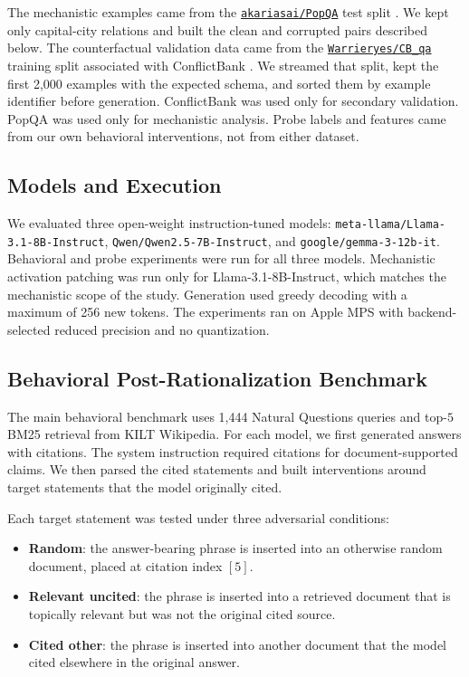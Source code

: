 \documentclass[11pt]{article}
\begin{document}
The mechanistic examples came from the \href{https://huggingface.co/datasets/akariasai/PopQA}{\texttt{akariasai/PopQA}} test split \cite{mallen2023popqa}. We kept only capital-city relations and built the clean and corrupted pairs described below. The counterfactual validation data came from the \href{https://huggingface.co/datasets/Warrieryes/CB_qa}{\texttt{Warrieryes/CB\_qa}} training split associated with ConflictBank \cite{su2024conflictbank}. We streamed that split, kept the first 2,000 examples with the expected schema, and sorted them by example identifier before generation. ConflictBank was used only for secondary validation. PopQA was used only for mechanistic analysis. Probe labels and features came from our own behavioral interventions, not from either dataset.

\subsection{Models and Execution}

We evaluated three open-weight instruction-tuned models: \texttt{meta-llama/Llama-3.1-8B-Instruct}, \texttt{Qwen/Qwen2.5-7B-Instruct}, and \texttt{google/gemma-3-12b-it}. Behavioral and probe experiments were run for all three models. Mechanistic activation patching was run only for Llama-3.1-8B-Instruct, which matches the mechanistic scope of the study. Generation used greedy decoding with a maximum of 256 new tokens. The experiments ran on Apple MPS with backend-selected reduced precision and no quantization.

\subsection{Behavioral Post-Rationalization Benchmark}

The main behavioral benchmark uses 1,444 Natural Questions queries and top-$5$ BM25 retrieval from KILT Wikipedia. For each model, we first generated answers with citations. The system instruction required citations for document-supported claims. We then parsed the cited statements and built interventions around target statements that the model originally cited.

Each target statement was tested under three adversarial conditions:

\begin{itemize}
    \item \textbf{Random}: the answer-bearing phrase is inserted into an otherwise random document, placed at citation index $[5]$.
    \item \textbf{Relevant uncited}: the phrase is inserted into a retrieved document that is topically relevant but was not the original cited source.
    \item \textbf{Cited other}: the phrase is inserted into another document that the model cited elsewhere in the original answer.
\end{itemize}
\end{document}

